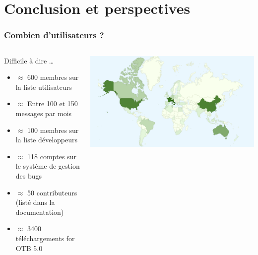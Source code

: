 \documentclass[8pt]{beamer}
\begin{document}
\section{Conclusion et perspectives}
\begin{frame}
\frametitle{Combien d'utilisateurs ?}
\begin{columns}[c]
\begin{block}{Difficile à dire \ldots}
\begin{itemize}
    \item $\approx$ 600 membres sur la liste utilisateurs
    \item $\approx$ Entre 100 et 150 messages par mois
    \item $\approx$ 100 membres sur la liste développeurs
    \item $\approx$ 118 comptes sur le système de gestion des bugs
    \item $\approx$ 50 contributeurs (listé dans la documentation)
    \item $\approx$ 3400 téléchargements for OTB 5.0
  \end{itemize}
\end{block}
\includegraphics[width=\textwidth]{images/OTB4_download_sourceforge_country_crop.png}
\end{columns}
\end{frame}
\end{document}
